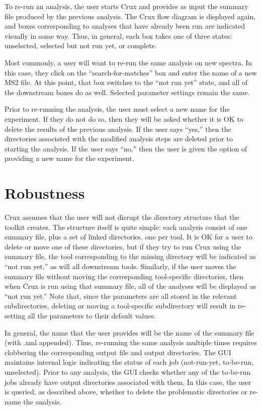 \documentclass{article}
\begin{document}
To re-run an analysis, the user starts Crux and provides as input the
summary file produced by the previous analysis.  The Crux flow diagram
is displayed again, and boxes corresponding to analyses that have
already been run are indicated visually in some way.  Thus, in
general, each box takes one of three states: unselected, selected but
not run yet, or complete.

Most commonly, a user will want to re-run the same analysis on new
spectra.  In this case, they click on the ``search-for-matches'' box
and enter the name of a new MS2 file.  At this point, that box
switches to the ``not run yet'' state, and all of the downstream boxes
do as well.  Selected parameter settings remain the same.

Prior to re-running the analysis, the user must select a new name for
the experiment.  If they do not do so, then they will be asked whether
it is OK to delete the results of the previous analysis.  If the user
says ``yes,'' then the directories associated with the modified
analysis steps are deleted prior to starting the analysis.  If the
user says ``no,'' then the user is given the option of providing a new
name for the experiment.

\section{Robustness}

Crux assumes that the user will not disrupt the directory structure
that the toolkit creates.  The structure itself is quite simple: each
analysis consist of one summary file, plus a set of linked
directories, one per tool.  It is OK for a user to delete or move one
of these directories, but if they try to run Crux using the summary
file, the tool corresponding to the missing directory will be
indicated as ``not run yet,'' as will all downstream tools.
Similarly, if the user moves the summary file without moving the
corresponding tool-specific directories, then when Crux is run using
that summary file, all of the analyses will be displayed as ``not run
yet.''  Note that, since the parameters are all stored in the relevant
subdirectories, deleting or moving a tool-specific subdirectory will
result in re-setting all the parameters to their default values.

In general, the name that the user provides will be the name of the
summary file (with .xml appended).  Thus, re-running the same analysis
multiple times requires clobbering the corresponding output file and
output directories.  The GUI maintains internal logic indicating the
status of each job (not-run-yet, to-be-run, unselected).  Prior to any
analysis, the GUI checks whether any of the to-be-run jobs already
have output directories associated with them.  In this case, the user
is queried, as described above, whether to delete the problematic
directories or re-name the analysis.
\end{document}
